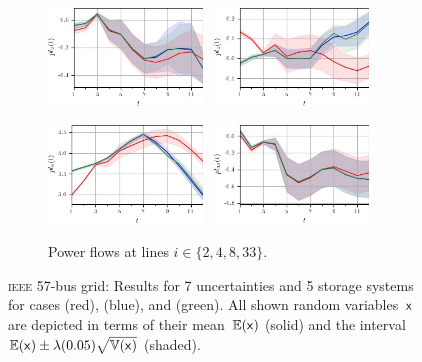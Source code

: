 \documentclass[final,3p,times,twocolumn]{elsarticle}  %
\begin{document}
\begin{figure}
    \begin{subfigure}[c]{\figwidth}
    \centering
        \includegraphics[width=0.45\textwidth]{figures/time series/case57_volatile/line_902.jpg}~
    	\includegraphics[width=0.45\textwidth]{figures/time series/case57_volatile/line_904.jpg}%
    \end{subfigure}
    \begin{subfigure}[c]{\figwidth}
    \centering
    	\includegraphics[width=0.45\textwidth]{figures/time series/case57_volatile/line_908.jpg}~
    	\includegraphics[width=0.45\textwidth]{figures/time series/case57_volatile/line_933.jpg}%
    	\vspace{-2mm}	
    	\caption{Power flows at lines $i\in\{2,4,8,33\}$.}
    \end{subfigure}
    	
    \vspace{2mm}	
	\vspace{\adjustlength}
	\caption{\textsc{ieee} 57-bus grid: Results for 7 uncertainties and 5 storage systems for cases \caseNoStorage (red), \caseStorage (blue), and \caseStorageWithVariance (green). All shown random variables~$\mathsf{x}$ are depicted in terms of their mean~$\mathbb{E}(\mathsf{x})$ (solid) and the interval $\mathbb{E}(\mathsf{x}) \pm \lambda (0.05) \sqrt{\mathbb{V}(\mathsf{x})}$ (shaded).}
\end{figure}
\end{document}
